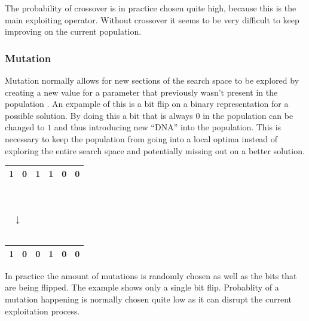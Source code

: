 The probability of crossover is in practice chosen quite high, because this is the main exploiting operator.
Without crossover it seems to be very difficult to keep improving on the current population.

\subsubsection*{Mutation}
Mutation normally allows for new sections of the search space to be explored by creating a new value for a parameter that previously wasn't present in the population \cite{genetics}.
An expample of this is a bit flip on a binary representation for a possible solution.
By doing this a bit that is always $0$ in the population can be changed to $1$ and thus introducing new ``DNA'' into the population.
This is necessary to keep the population from going into a local optima instead of exploring the entire search space and potentially missing out on a better solution. \\

\begin{center}
\begin{tabular}{|c|c|c|c|c|c|}
\hline
1 & 0 & \textbf{1} & 1 & 0 & 0 \\ 
\hline
\end{tabular}
\\
$\:$ \\
$\quad \downarrow \: \qquad \:$ \\
$\:$ \\
\begin{tabular}{|c|c|c|c|c|c|}
\hline
1 & 0 & \textbf{0} & 1 & 0 & 0 \\ \hline
\end{tabular}
\end{center}

In practice the amount of mutations is randomly chosen as well as the bits that are being flipped.
The example shows only a single bit flip.
Probablity of a mutation happening is normally chosen quite low as it can disrupt the current exploitation process.